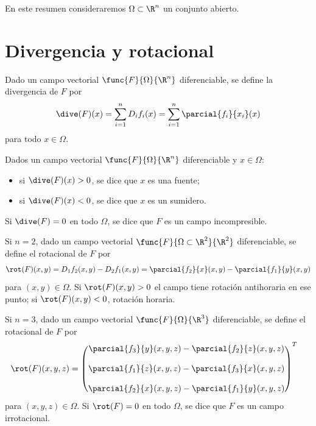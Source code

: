 \documentclass[a4,11pt]{aleph-notas}
\begin{document}
\encabezado

En este resumen consideraremos $\Omega\subset \R^n$ un conjunto abierto.

\section{Divergencia y rotacional}

\begin{defi}[Divergencia]
    Dado un campo vectorial $\func{F}{\Omega}{\R^n}$ diferenciable, se define la divergencia de $F$ por
    \[
        \dive(F)(x) = \sum_{i=1}^n D_i f_i(x) = \sum_{i=1}^n \parcial{f_i}{x_i}(x)
    \]
    para todo $x\in\Omega$.
\end{defi}

\begin{defi}
    Dados un campo vectorial $\func{F}{\Omega}{\R^n}$ diferenciable y $x\in\Omega$:
    \begin{itemize}
        \item si $\dive(F)(x)>0$, se dice que $x$ es una fuente;
        \item si $\dive(F)(x)<0$, se dice que $x$ es un sumidero.
    \end{itemize}
    Si $\dive(F)=0$ en todo $\Omega$, se dice que $F$ es un campo incompresible.
\end{defi}

\begin{defi}[Rotacional en $\R^2$]
    Si $n=2$, dado un campo vectorial $\func{F}{\Omega\subset \R^2}{\R^2}$ diferenciable, se define el rotacional de $F$ por
    \[
        \rot(F)(x,y) = D_1 f_2(x,y) - D_2 f_1(x,y) = \parcial{f_2}{x}(x,y) - \parcial{f_1}{y}(x,y)
    \]
    para $(x,y)\in \Omega$. Si $\rot(F)(x,y)>0$ el campo tiene rotación antihoraria en ese punto; si $\rot(F)(x,y)<0$, rotación horaria.
\end{defi}

\begin{defi}[Rotacional en $\R^3$]
    Si $n=3$, dado un campo vectorial $\func{F}{\Omega}{\R^3}$ diferenciable, se define el rotacional de $F$ por
    \begin{align*}
        \rot(F)(x,y,z)
        & = \begin{pmatrix}
                \parcial{f_3}{y}(x,y,z) - \parcial{f_2}{z}(x,y,z) \\[4mm]
                \parcial{f_1}{z}(x,y,z) - \parcial{f_3}{x}(x,y,z) \\[4mm]
                \parcial{f_2}{x}(x,y,z) - \parcial{f_1}{y}(x,y,z)
            \end{pmatrix}^T
    \end{align*}
    para $(x,y,z)\in \Omega$. Si $\rot(F)=0$ en todo $\Omega$, se dice que $F$ es un campo irrotacional.
\end{defi}
\end{document}

